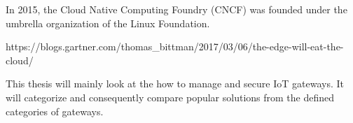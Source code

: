 In 2015, the Cloud Native Computing Foundry (CNCF) was founded under the 
umbrella organization of the Linux Foundation. 

https://blogs.gartner.com/thomas_bittman/2017/03/06/the-edge-will-eat-the-cloud/



This thesis will mainly look at the how to manage and secure IoT gateways. It will categorize and consequently compare popular solutions from the defined categories of gateways. 